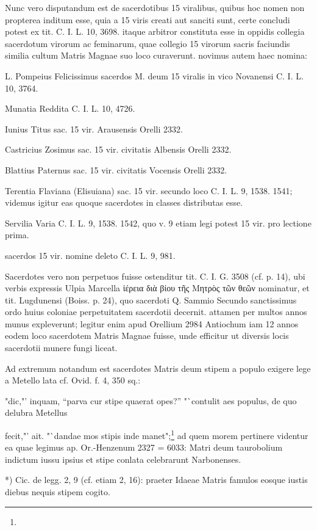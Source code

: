 \documentclass[a4paper, 11pt, oneside, polutonikogreek, german]{article}
\begin{document}
Nunc vero disputandum est de sacerdotibus 15 viralibus, quibus hoc nomen non propterea inditum esse, quia a 15 viris creati aut sanciti sunt, certe concludi potest ex tit. C. I. L. 10, 3698. itaque arbitror constituta esse in oppidis collegia sacerdotum virorum ac feminarum, quae collegio 15 virorum sacris faciundis similia cultum Matris Magnae suo loco curaverunt. novimus autem haec nomina:

L. Pompeius Felicissimus sacerdos M. deum 15 viralis in vico Novanensi C. I. L. 10, 3764.

Munatia Reddita C. I. L. 10, 4726.

Iunius Titus sac. 15 vir. Arausensis Orelli 2332.

Castricius Zosimus sac. 15 vir. civitatis Albensis Orelli 2332.

Blattius Paternus sac. 15 vir. civitatis Vocensis Orelli 2332.

Terentia Flaviana (Elisuiana) sac. 15 vir. secundo loco C. I. L. 9, 1538. 1541; videmus igitur eas quoque sacerdotes in classes distributas esse.

Servilia Varia C. I. L. 9, 1538. 1542, quo v. 9 etiam legi potest 15 vir. pro lectione prima.

sacerdos 15 vir. nomine deleto C. I. L. 9, 981.

Sacerdotes vero non perpetuos fuisse ostenditur tit. C. I. G. 3508 (cf. p. 14), ubi verbis expressis Ulpia Marcella ἱέρεια διὰ βίου τῆς Μητρὸς τῶν θεῶν nominatur, et tit. Lugdunensi (Boiss. p. 24), quo sacerdoti Q. Sammio Secundo sanctissimus ordo huius coloniae perpetuitatem sacerdotii decernit. attamen per multos annos munus expleverunt; legitur enim apud Orellium 2984 Antiochum iam 12 annos eodem loco sacerdotem Matris Magnae fuisse, unde efficitur ut diversis locis sacerdotii munere fungi liceat.

Ad extremum notandum est sacerdotes Matris deum stipem a populo exigere lege a Metello lata cf. Ovid. f. 4, 350 sq.:

"dic,"' inquam, "`parva cur stipe quaerat opes?"'  "`contulit aes populus, de quo delubra Metellus

fecit,"' ait. "`dandae mos stipis inde manet";\footnote{} ad quem morem pertinere videntur ea quae legimus ap. Or.-Henzenum 2327 = 6033: Matri deum taurobolium indictum iussu ipsius et stipe conlata celebrarunt Narbonenses.

*) Cic. de legg. 2, 9 (cf. etiam 2, 16): praeter Idaeae Matris famulos eosque iustis diebus nequis stipem cogito.
\end{document}
